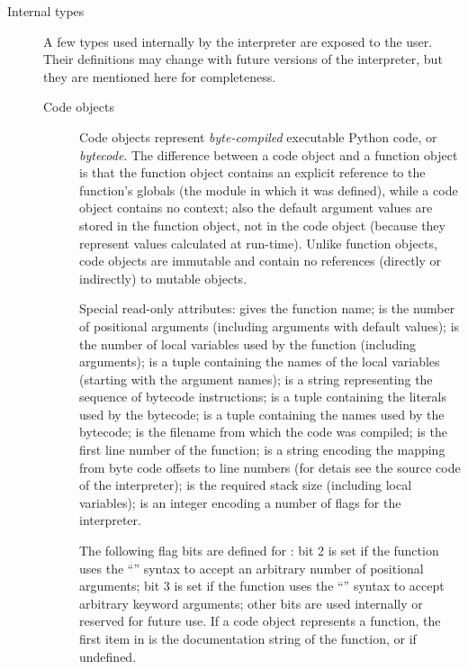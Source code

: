 \begin{description}
\item[Internal types]
A few types used internally by the interpreter are exposed to the user.
Their definitions may change with future versions of the interpreter,
but they are mentioned here for completeness.

\begin{description}

\item[Code objects]
Code objects represent \emph{byte-compiled} executable Python code, or 
\emph{bytecode}.
The difference between a code
object and a function object is that the function object contains an
explicit reference to the function's globals (the module in which it
was defined), while a code object contains no context; 
also the default argument values are stored in the function object,
not in the code object (because they represent values calculated at
run-time).  Unlike function objects, code objects are immutable and
contain no references (directly or indirectly) to mutable objects.

Special read-only attributes:  gives
the function name; 
is the number of positional arguments (including arguments with
default values);  is the number
of local variables used by the function (including arguments);
 is a tuple containing the
names of the local variables (starting with the argument names);
 is a string representing the sequence
of bytecode instructions;  is a
tuple containing the literals used by the bytecode;
 is a tuple containing the names used 
by the bytecode;  is the
filename from which the code was compiled;
 is the first line number 
of the function;  is a string 
encoding the mapping from byte code offsets to line numbers (for
detais see the source code of the interpreter);
 is the required stack size
(including local variables);  is an
integer encoding a number of flags for the interpreter.

The following flag bits are defined for : bit 2 is set
if the function uses the ``'' syntax to accept an
arbitrary number of positional arguments; bit 3 is set if the function
uses the ``'' syntax to accept arbitrary keyword
arguments; other bits are used internally or reserved for future use.
If a code object represents a function, the first item in
 is the documentation string of the
function, or  if undefined.


\end{description}
\end{description}
